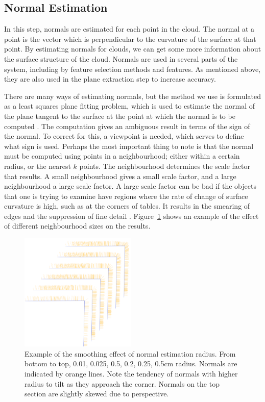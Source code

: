 \documentclass[11pt,a4paper]{kth-mag}
\begin{document}
\subsection{Normal Estimation}
In this step, normals are estimated for each point in the cloud. The normal at a
point is the vector which is perpendicular to the curvature of the surface at
that point. By estimating normals for clouds, we can get some more information
about the surface structure of the cloud. Normals are used in several parts of
the system, including by feature selection methods and features. As mentioned
above, they are also used in the plane extraction step to increase accuracy.

There are many ways of estimating normals, but the method we use is formulated
as a least squares plane fitting problem, which is used to estimate the normal
of the plane tangent to the surface at the point at which the normal is to be
computed \cite{RusuDoctoralDissertation}. The computation gives an ambiguous
result in terms of the sign of the normal. To correct for this, a viewpoint is
needed, which serves to define what sign is used. Perhaps the most important
thing to note is that the normal must be computed using points in a
neighbourhood; either within a certain radius, or the nearest $k$ points. The
neighbourhood determines the scale factor that results. A small neighbourhood
gives a small scale factor, and a large neighbourhood a large scale factor. A
large scale factor can be bad if the objects that one is trying to examine have
regions where the rate of change of surface curvature is high, such as at the
corners of tables. It results in the smearing of edges and the suppression of
fine detail \cite{RusuDoctoralDissertation}. Figure~\ref{fig:normal_corner}
shows an example of the effect of different neighbourhood sizes on the results.

\begin{figure}
  \centering
  \includegraphics[width=0.49\textwidth]{images/normals_comb}
  \caption{Example of the smoothing effect of normal estimation radius. From
    bottom to top, 0.01, 0.025, 0.5, 0.2, 0.25, 0.5cm radius. Normals are
    indicated by orange lines. Note the tendency of normals with higher radius
    to tilt as they approach the corner. Normals on the top section are slightly
    skewed due to perspective.}
  \label{fig:normal_corner}
\end{figure}
\end{document}
